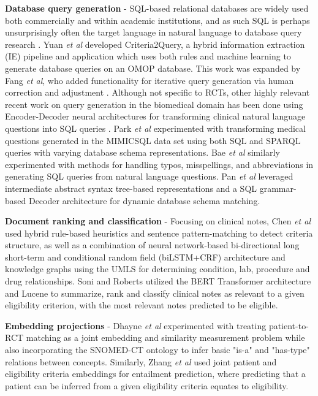 \documentclass[../main.tex]{subfiles}
\begin{document}
\textbf{Database query generation} - SQL-based relational databases are widely used both commercially and within academic institutions, and as such SQL is perhaps unsurprisingly often the target language in natural language to database query research \cite{dar2019frameworks}. Yuan \textit{et al} developed Criteria2Query, a hybrid information extraction (IE) pipeline and application which uses both rules and machine learning to generate database queries on an OMOP database. This work was expanded by Fang \textit{et al}, who added functionality for iterative query generation via human correction and adjustment \cite{fang2022combining}. Although not specific to RCTs, other highly relevant recent work on query generation in the biomedical domain has been done using Encoder-Decoder neural architectures for transforming clinical natural language questions into SQL queries \cite{bae2021question, park2021knowledge, wang2020text, pan2021bert, dhayne2021emr2vec}. Park \textit{et al} \cite{park2021knowledge} experimented with transforming medical questions generated in the MIMICSQL data set \cite{johnson2016mimic, wang2020text} using both SQL and SPARQL queries with varying database schema representations. Bae \textit{et al} similarly experimented with methods for handling typos, misspellings, and abbreviations in generating SQL queries from natural language questions. Pan \textit{et al} \cite{pan2021bert} leveraged intermediate abstract syntax tree-based representations and a SQL grammar-based Decoder architecture for dynamic database schema matching. 

\textbf{Document ranking and classification} - Focusing on clinical notes, Chen \textit{et al} \cite{chen2019clinical} used hybrid rule-based heuristics and sentence pattern-matching to detect criteria structure, as well as a combination of neural network-based bi-directional long short-term and conditional random field (biLSTM+CRF) architecture and knowledge graphs using the UMLS for determining condition, lab, procedure and drug relationships. Soni and Roberts \cite{soni2020patient} utilized the BERT Transformer architecture \cite{devlin2018bert} and Lucene \cite{lucene} to summarize, rank and classify clinical notes as relevant to a given eligibility criterion, with the most relevant notes predicted to be eligible. 

\textbf{Embedding projections} - Dhayne \textit{et al} \cite{dhayne2021emr2vec} experimented with treating patient-to-RCT matching as a joint embedding and similarity measurement problem while also incorporating the SNOMED-CT ontology to infer basic "is-a" and "has-type" relations between concepts. Similarly, Zhang \textit{et al} \cite{zhang2020deepenroll} used joint patient and eligibility criteria embeddings for entailment prediction, where predicting that a patient can be inferred from a given eligibility criteria equates to eligibility. 
\end{document}
